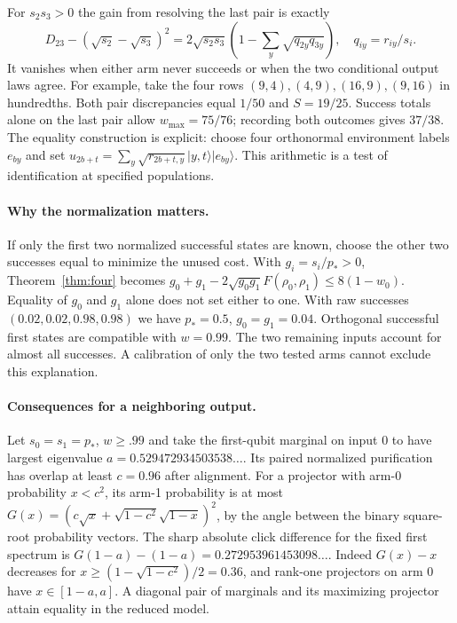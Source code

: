 \documentclass[11pt,letterpaper]{article}
\begin{document}
For $s_2s_3>0$ the gain from resolving the last pair is exactly
\[
 D_{23}-(\sqrt{s_2}-\sqrt{s_3})^2
 =2\sqrt{s_2s_3}\left(1-\sum_y\sqrt{q_{2y}q_{3y}}\right),
 \quad q_{iy}=r_{iy}/s_i.
\]
It vanishes when either arm never succeeds or when the two conditional output laws agree. For example, take the four rows $(9,4),(4,9),(16,9),(9,16)$ in hundredths. Both pair discrepancies equal $1/50$ and $S=19/25$. Success totals alone on the last pair allow $w_{\max}=75/76$; recording both outcomes gives $37/38$. The equality construction is explicit: choose four orthonormal environment labels $e_{by}$ and set $u_{2b+t}=\sum_y\sqrt{r_{2b+t,y}}|y,t\rangle|e_{by}\rangle$. This arithmetic is a test of identification at specified populations.

\paragraph{Why the normalization matters.}
If only the first two normalized successful states are known, choose the other two successes equal to minimize the unused cost. With $g_i=s_i/p_*>0$, Theorem~\ref{thm:four} becomes $g_0+g_1-2\sqrt{g_0g_1}F(\rho_0,\rho_1)\le8(1-w_0)$. Equality of $g_0$ and $g_1$ alone does not set either to one. With raw successes $(0.02,0.02,0.98,0.98)$ we have $p_*=0.5$, $g_0=g_1=0.04$. Orthogonal successful first states are compatible with $w=0.99$. The two remaining inputs account for almost all successes. A calibration of only the two tested arms cannot exclude this explanation.

\paragraph{Consequences for a neighboring output.}
Let $s_0=s_1=p_*$, $w\ge.99$ and take the first-qubit marginal on input 0 to have largest eigenvalue $a=0.529472934503538\ldots$. Its paired normalized purification has overlap at least $c=0.96$ after alignment. For a projector with arm-0 probability $x<c^2$, its arm-1 probability is at most $G(x)=(c\sqrt{x}+\sqrt{1-c^2}\sqrt{1-x})^2$, by the angle between the binary square-root probability vectors. The sharp absolute click difference for the fixed first spectrum is $G(1-a)-(1-a)=0.272953961453098\ldots$. Indeed $G(x)-x$ decreases for $x\ge(1-\sqrt{1-c^2})/2=0.36$, and rank-one projectors on arm 0 have $x\in[1-a,a]$. A diagonal pair of marginals and its maximizing projector attain equality in the reduced model.
\end{document}
